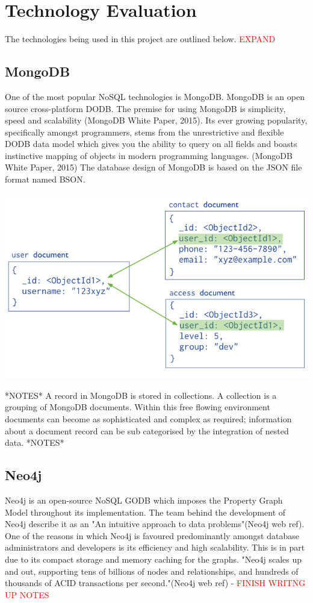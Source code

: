 \chapter{Technology Evaluation}
The technologies being used in this project are outlined below. \textcolor{red}{EXPAND}
\section{MongoDB}\label{mongo}
One of the most popular NoSQL technologies is MongoDB. MongoDB is an open source cross-platform DODB. The premise for using MongoDB is simplicity, speed and scalability (MongoDB White Paper, 2015). Its ever growing popularity, specifically amongst programmers, stems from the unrestrictive and flexible DODB data model which gives you the ability to query on all fields and boasts instinctive mapping of objects in modern programming languages. (MongoDB White Paper, 2015) The database design of MongoDB is based on the JSON file format named BSON. \begin{center}\includegraphics[width=1\linewidth]{images/mongodbmodel}\end{center}

*NOTES* A record in MongoDB is stored in collections. A collection is a grouping of MongoDB documents.
Within this free flowing environment documents can become as sophisticated and complex as required; information about a document record can be sub categorised by the integration of nested data. *NOTES*

\section{Neo4j}\label{neo}
Neo4j is an open-source NoSQL GODB which imposes the Property Graph Model throughout its implementation. The team behind the development of Neo4j describe it as an "An intuitive approach to data problems"(Neo4j web ref). One of the reasons in which Neo4j is favoured predominantly amongst database administrators and developers is its efficiency and high scalability. This is in part due to its compact storage and memory caching for the graphs. "Neo4j scales up and out, supporting tens of billions of nodes and relationships, and hundreds of thousands of ACID transactions per second."(Neo4j web ref) -\textcolor{red}{ FINISH WRITNG UP NOTES}


